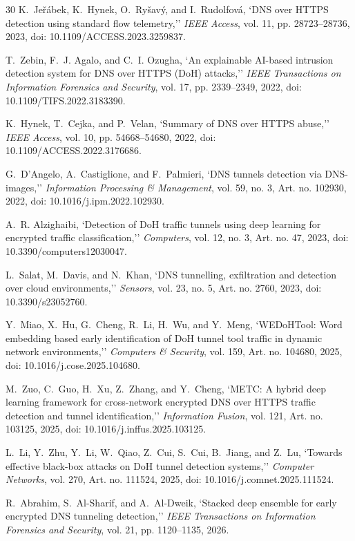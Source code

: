 \documentclass[conference]{IEEEtran}
\begin{document}
\begin{thebibliography}{30}
K.~Je\v{r}\'abek, K.~Hynek, O.~Ry\v{s}av\'y, and I.~Rudolfov\'a, `DNS over HTTPS detection using standard flow telemetry,'' \emph{IEEE Access}, vol. 11, pp. 28723--28736, 2023, doi: 10.1109/ACCESS.2023.3259837.

T.~Zebin, F.~J. Agalo, and C.~I. Ozugha, `An explainable AI-based intrusion detection system for DNS over HTTPS (DoH) attacks,'' \emph{IEEE Transactions on Information Forensics and Security}, vol. 17, pp. 2339--2349, 2022, doi: 10.1109/TIFS.2022.3183390.

K.~Hynek, T.~Cejka, and P.~Velan, `Summary of DNS over HTTPS abuse,'' \emph{IEEE Access}, vol. 10, pp. 54668--54680, 2022, doi: 10.1109/ACCESS.2022.3176686.

G.~D'Angelo, A.~Castiglione, and F.~Palmieri, `DNS tunnels detection via DNS-images,'' \emph{Information Processing \& Management}, vol. 59, no. 3, Art. no. 102930, 2022, doi: 10.1016/j.ipm.2022.102930.

A.~R. Alzighaibi, `Detection of DoH traffic tunnels using deep learning for encrypted traffic classification,'' \emph{Computers}, vol. 12, no. 3, Art. no. 47, 2023, doi: 10.3390/computers12030047.

L.~Salat, M.~Davis, and N.~Khan, `DNS tunnelling, exfiltration and detection over cloud environments,'' \emph{Sensors}, vol. 23, no. 5, Art. no. 2760, 2023, doi: 10.3390/s23052760.

Y.~Miao, X.~Hu, G.~Cheng, R.~Li, H.~Wu, and Y.~Meng, `WEDoHTool: Word embedding based early identification of DoH tunnel tool traffic in dynamic network environments,'' \emph{Computers \& Security}, vol. 159, Art. no. 104680, 2025, doi: 10.1016/j.cose.2025.104680.

M.~Zuo, C.~Guo, H.~Xu, Z.~Zhang, and Y.~Cheng, `METC: A hybrid deep learning framework for cross-network encrypted DNS over HTTPS traffic detection and tunnel identification,'' \emph{Information Fusion}, vol. 121, Art. no. 103125, 2025, doi: 10.1016/j.inffus.2025.103125.

L.~Li, Y.~Zhu, Y.~Li, W.~Qiao, Z.~Cui, S.~Cui, B.~Jiang, and Z.~Lu, `Towards effective black-box attacks on DoH tunnel detection systems,'' \emph{Computer Networks}, vol. 270, Art. no. 111524, 2025, doi: 10.1016/j.comnet.2025.111524.

R.~Abrahim, S.~Al-Sharif, and A.~Al-Dweik, `Stacked deep ensemble for early encrypted DNS tunneling detection,'' \emph{IEEE Transactions on Information Forensics and Security}, vol. 21, pp. 1120--1135, 2026.


\end{thebibliography}
\end{document}
